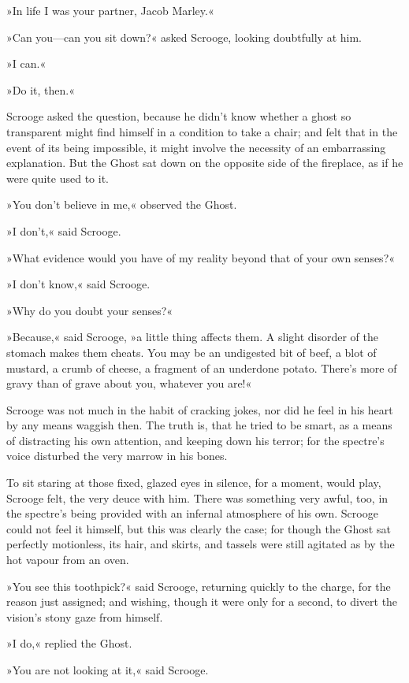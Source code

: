 »In life I was your partner, Jacob Marley.«

»Can you—can you sit down?« asked Scrooge, looking doubtfully at him.

»I can.«

»Do it, then.«

Scrooge asked the question, because he didn't know whether a ghost so transparent might find himself in a condition to take a chair; and felt that in the event of its being impossible, it might involve the necessity of an embarrassing explanation. But the Ghost sat down on the opposite side of the fireplace, as if he were quite used to it.

»You don't believe in me,« observed the Ghost.

»I don't,« said Scrooge.

»What evidence would you have of my reality beyond that of your own senses?«

»I don't know,« said Scrooge.

»Why do you doubt your senses?«

»Because,« said Scrooge, »a little thing affects them. A slight disorder of the stomach makes them cheats. You may be an undigested bit of beef, a blot of mustard, a crumb of cheese, a fragment of an underdone potato. There's more of gravy than of grave about you, whatever you are!«

Scrooge was not much in the habit of cracking jokes, nor did he feel in his heart by any means waggish then. The truth is, that he tried to be smart, as a means of distracting his own attention, and keeping down his terror; for the spectre's voice disturbed the very marrow in his bones.

To sit staring at those fixed, glazed eyes in silence, for a moment, would play, Scrooge felt, the very deuce with him. There was something very awful, too, in the spectre's being provided with an infernal atmosphere of his own. Scrooge could not feel it himself, but this was clearly the case; for though the Ghost sat perfectly motionless, its hair, and skirts, and tassels were still agitated as by the hot vapour from an oven.

»You see this toothpick?« said Scrooge, returning quickly to the charge, for the reason just assigned; and wishing, though it were only for a second, to divert the vision's stony gaze from himself.

»I do,« replied the Ghost.

»You are not looking at it,« said Scrooge.

